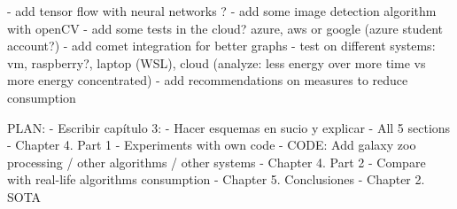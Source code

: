 - add tensor flow with neural networks ?
- add some image detection algorithm with openCV
- add some tests in the cloud? azure, aws or google (azure student account?)
- add comet integration for better graphs
- test on different systems: vm, raspberry?, laptop (WSL), cloud (analyze: less energy over more time vs more energy concentrated)
- add recommendations on measures to reduce consumption


PLAN:
- Escribir capítulo 3:
   - Hacer esquemas en sucio y explicar
   - All 5 sections
- Chapter 4. Part 1 - Experiments with own code
- CODE: Add galaxy zoo processing / other algorithms / other systems
- Chapter 4. Part 2 - Compare with real-life algorithms consumption
- Chapter 5. Conclusiones
- Chapter 2. SOTA